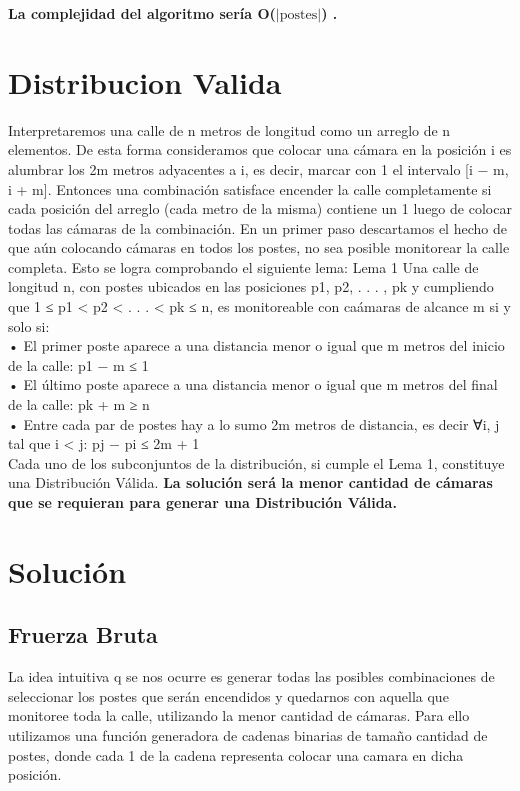 \documentclass{article}
\begin{document}
\textbf{La complejidad del algoritmo sería O($|\text{postes}|$) .}


\section{Distribucion Valida}

Interpretaremos una calle de n metros de longitud como un arreglo de n elementos. De esta forma consideramos que colocar una cámara en la posición i es alumbrar los 2m metros adyacentes a i, es
decir, marcar con 1 el intervalo [i − m, i + m]. Entonces una combinación satisface encender la calle
completamente si cada posición del arreglo (cada metro de la misma) contiene un 1 luego de colocar
todas las cámaras de la combinación.
En un primer paso descartamos el hecho de que aún colocando cámaras en todos los postes, no
sea posible monitorear la calle completa. Esto se logra comprobando el siguiente lema:
Lema 1
Una calle de longitud n, con postes ubicados en las posiciones p1, p2, . . . , pk y cumpliendo que 1 ≤ p1 < p2 < . . . < pk ≤ n, es monitoreable con caámaras de alcance m si y solo si:\\
• El primer poste aparece a una distancia menor o igual que m metros del inicio de la calle: p1 − m ≤ 1\\
• El último poste aparece a una distancia menor o igual que m metros del final de la calle: pk + m ≥ n\\
• Entre cada par de postes hay a lo sumo 2m metros de distancia, es decir ∀i, j tal que i < j: pj − pi ≤ 2m + 1\\
Cada uno de los subconjuntos de la distribución, si cumple el Lema 1, constituye una Distribución Válida. 
\textbf{La solución será la menor cantidad de cámaras que se requieran para generar una Distribución Válida.}


\section{Solución}

\subsection{Fruerza Bruta}

La idea intuitiva q se nos ocurre es generar todas las posibles combinaciones de seleccionar los postes que serán
encendidos y quedarnos con aquella que monitoree toda la calle, utilizando la menor cantidad de cámaras. Para ello utilizamos una función generadora de cadenas binarias de tamaño cantidad de postes, donde cada 1 de la cadena representa colocar una camara en dicha posición.
\end{document}
